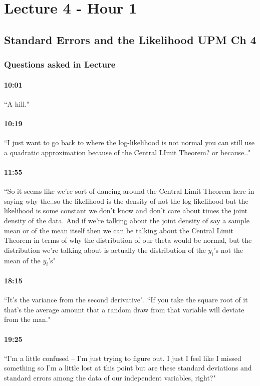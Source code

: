 \documentclass[11pt]{article}
\begin{document}
\section{Lecture 4 - Hour 1}
\subsection{Standard Errors and the Likelihood UPM Ch 4}
\subsubsection{Questions asked in Lecture}
\paragraph{10:01}  ``A hill."
\paragraph{10:19}  ``I just want to go back to where the log-likelihood is not normal you can still use a quadratic approximation because of the Central LImit Theorem? or because.."
\paragraph{11:55}  ``So it seems like we're sort of dancing around the Central Limit Theorem here in saying why the..so the likelihood is the density of not the log-likelihood but the likelihood is some constant we don't know and don't care about times the joint density of the data. And if we're talking about the joint density of say a sample mean or of the mean itself then we can be talking about the Central Limit Theorem in terms of why the distribution of our theta would be normal, but the distribution we're talking about is actually the distribution of the $y_i$'s not the mean of the $y_i$'s"
\paragraph{18:15} ``It's the variance from the second derivative".  ``If you take the square root of it that's the average amount that a random draw from that variable will deviate from the man."
\paragraph{19:25}  ``I'm a little confused -- I'm just trying to figure out.  I just I feel like I missed something so I'm a little lost at this point but are these standard deviations and standard errors among the data of our independent variables, right?"
\end{document}
